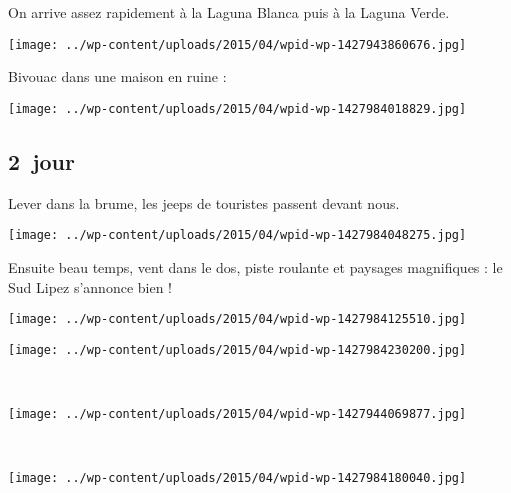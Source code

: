  On arrive assez rapidement à la Laguna Blanca puis à la Laguna Verde.
\begin{center} \texttt{[image: ../wp-content/uploads/2015/04/wpid-wp-1427943860676.jpg]} \end{center}
\vspace{-\topsep}

\pagebreak
 Bivouac dans une maison en ruine :
\begin{center} \texttt{[image: ../wp-content/uploads/2015/04/wpid-wp-1427984018829.jpg]} \end{center}

\subsection*{2\ieme\ jour} 
 Lever dans la brume, les jeeps de touristes passent devant nous.
\begin{center} \texttt{[image: ../wp-content/uploads/2015/04/wpid-wp-1427984048275.jpg]} \end{center}
\vspace{-\topsep}

\pagebreak
 Ensuite beau temps, vent dans le dos, piste roulante et paysages magnifiques : le Sud Lipez s'annonce bien !
\begin{center} \texttt{[image: ../wp-content/uploads/2015/04/wpid-wp-1427984125510.jpg]} \end{center}
\begin{center} \texttt{[image: ../wp-content/uploads/2015/04/wpid-wp-1427984230200.jpg]} \end{center}
\vspace{-\topsep}
\vspace{-2.75mm}

\pagebreak
~
\begin{center} \texttt{[image: ../wp-content/uploads/2015/04/wpid-wp-1427944069877.jpg]} \end{center}
~\\
\begin{center} \texttt{[image: ../wp-content/uploads/2015/04/wpid-wp-1427984180040.jpg]} \end{center}
\vspace{-\topsep}

